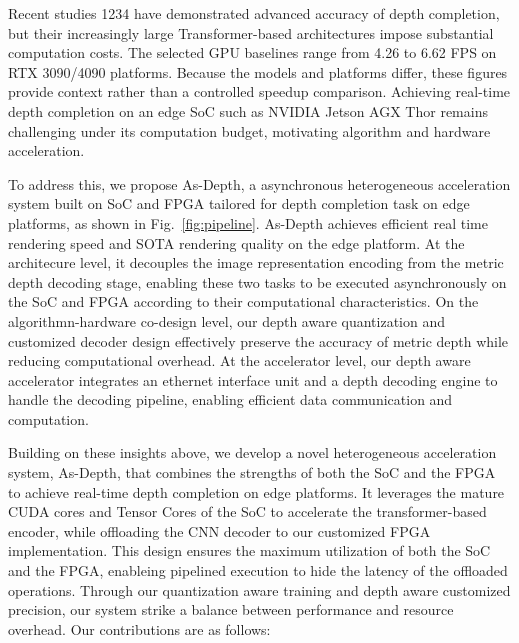 Recent studies 1234 have demonstrated advanced accuracy of depth completion, but their increasingly large Transformer-based architectures impose substantial computation costs. The selected GPU baselines range from 4.26 to 6.62 FPS on RTX 3090/4090 platforms. Because the models and platforms differ, these figures provide context rather than a controlled speedup comparison. Achieving real-time depth completion on an edge SoC such as NVIDIA Jetson AGX Thor remains challenging under its computation budget, motivating algorithm and hardware acceleration.


To address this, we propose As-Depth, a asynchronous heterogeneous acceleration system built on SoC and FPGA tailored for depth completion task on edge platforms, as shown in Fig.~\ref{fig:pipeline}.
As-Depth achieves efficient real time rendering speed and SOTA rendering quality on the edge platform. At the architecure level, it decouples the image representation encoding from the metric depth decoding stage, enabling these two tasks to be executed asynchronously on the SoC and FPGA according to their computational characteristics. On the algorithmn-hardware co-design level, our depth aware quantization and customized decoder design effectively preserve the accuracy of metric depth while reducing computational overhead. At the accelerator level, our depth aware accelerator integrates an ethernet interface unit and a depth decoding engine to handle the decoding pipeline, enabling efficient data communication and computation.

Building on these insights above, we develop a novel heterogeneous acceleration system, As-Depth, that combines the strengths of both the SoC and the FPGA to achieve real-time depth completion on edge platforms. It leverages the mature CUDA cores and Tensor Cores of the SoC to accelerate the transformer-based encoder, while offloading the CNN decoder to our customized FPGA implementation. This design ensures the maximum utilization of both the SoC and the FPGA, enableing pipelined execution to hide the latency of the offloaded operations. Through our quantization aware training and depth aware customized precision, our system strike a balance between performance and resource overhead. Our contributions are as follows:  

